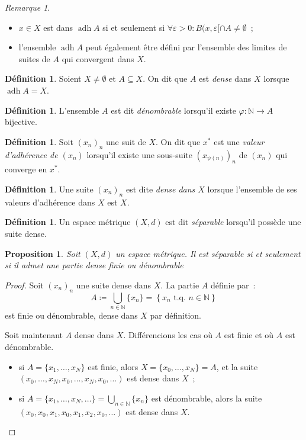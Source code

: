 \documentclass{report}
\newtheorem{prp}[thm]{Proposition}
\theoremstyle{definition}
\newtheorem{déf}[thm]{Définition}
\theoremstyle{remark}
\newtheorem*{rmq}{Remarque}
\newcommand{\N}{\mathbb N}
\newcommand{\tq}{\text{ t.q. }}
\DeclareMathOperator{\adh}{adh}
\begin{document}
			\begin{rmq}~
			\begin{itemize}
				\item $x \in X$ est dans $\adh A$ si et seulement si $\forall \varepsilon > 0 : B(x, \varepsilon[ \cap A \neq \emptyset$~;
				\item l'ensemble $\adh A$ peut également être défini par l'ensemble des limites de suites de $A$ qui convergent dans $X$.
			\end{itemize}
			\end{rmq}

			\begin{déf} Soient $X \neq \emptyset$ et $A \subseteq X$. On dit que $A$ est \textit{dense} dans $X$ lorsque $\adh A = X$.
			\end{déf}

			\begin{déf} L'ensemble $A$ est dit \textit{dénombrable} lorsqu'il existe $\varphi : \N \to A$ bijective.
			\end{déf}

			\begin{déf} Soit $(x_n)_n$ une suit de $X$. On dit que $x^*$ est une \textit{valeur d'adhérence de $(x_n)$} lorsqu'il existe une sous-suite
			$(x_{\psi(n)})_n$ de $(x_n)$ qui converge en $x^*$.
			\end{déf}

			\begin{déf}Une suite $(x_n)_n$ est dite \textit{dense dans $X$} lorsque l'ensemble de ses valeurs d'adhérence dans $X$ est $X$.
			\end{déf}

			\begin{déf} Un espace métrique $(X, d)$ est dit \textit{séparable} lorsqu'il possède une suite dense.
			\end{déf}

			\begin{prp} Soit $(X, d)$ un espace métrique. Il est séparable si et seulement si il admet une partie dense finie ou dénombrable
			\end{prp}

			\begin{proof} Soit $(x_n)_n$ une suite dense dans $X$. La partie $A$ définie par~:
			\[A \coloneqq \bigcup_{n \in \N}\{x_n\} = \left\{x_n \tq n \in \N\right\}\]
			est finie ou dénombrable, dense dans $X$ par définition.

			Soit maintenant $A$ dense dans $X$. Différencions les cas où $A$ est finie et où $A$ est dénombrable.
			\begin{itemize}
				\item si $A = \{x_1, \ldots, x_N\}$ est finie, alors $X = \{x_0, \ldots, x_N\} = A$, et la suite $(x_0, \ldots, x_N, x_0, \ldots, x_N, x_0, \ldots)$
				est dense dans $X$~;
				\item si $A = \{x_1, \ldots, x_N, \ldots\} = \bigcup_{n \in \N}\{x_n\}$ est dénombrable, alors la suite $(x_0, x_0, x_1, x_0, x_1, x_2, x_0, \ldots)$
				est dense dans $X$.
			\end{itemize}
			\end{proof}
\end{document}

